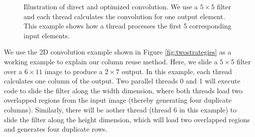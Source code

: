 \begin{figure}[!t]
\centering
{}
\hspace{0em}
\hspace{0em}

\caption{Illustration of direct and optimized convolution. We use a $5 \times 5$ filter  and each thread calculates the convolution for one
output element. This example shows how a thread processes the first 5 corresponding input elements.} \label{fig:corealgo}
\end{figure}

 We use the 2D convolution example shown in Figure \ref{fig:twostrategies} as a working example to explain our
column reuse method. Here, we slide a $5 \times 5$ filter over a $6 \times 11$ image to produce a $2 \times 7$ output. In this example,
each thread calculates one column of the output. Two parallel threads 0 and 1 will execute code to slide the filter along the width
dimension, where both threads load two overlapped regions from the input image (thereby generating four duplicate columns). Similarly,
there will be aother thread (thread 6 in this example) to slide the filter along the height dimension, which will load two overlapped
regions and generates four duplicate rows.




